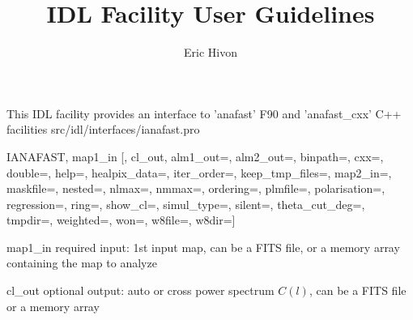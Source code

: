 
\sloppy

\title{\healpix IDL Facility User Guidelines}
 \section[ianafast]{ }
\label{idl:ianafast}
\author{Eric Hivon}

\begin{facility}
{This IDL facility provides an interface to 'anafast' F90 and 'anafast\_cxx' C++ facilities}
{src/idl/interfaces/ianafast.pro}
\end{facility}

\begin{IDLformat}
{IANAFAST,  map1\_in [, cl\_out,
       alm1\_out=, alm2\_out=, binpath=, cxx=, double=, help=, healpix\_data=, iter\_order=, keep\_tmp\_files=, 
       map2\_in=, maskfile=, nested=, nlmax=, nmmax=, ordering=, plmfile=, polarisation=, 
       regression=, ring=, show\_cl=, simul\_type=, silent=, theta\_cut\_deg=, tmpdir=, 
       weighted=, won=, w8file=, w8dir=]}
\end{IDLformat}

\begin{qualifiers}
  \begin{qulist}{} %
   \item[map1\_in] required input: 1st input map, can be a FITS file, or a memory array containing the
        map to analyze
    \item[cl\_out] optional output: auto or cross power spectrum $C(l)$, can be a FITS
file or a memory array
  \end{qulist}
\end{qualifiers}

